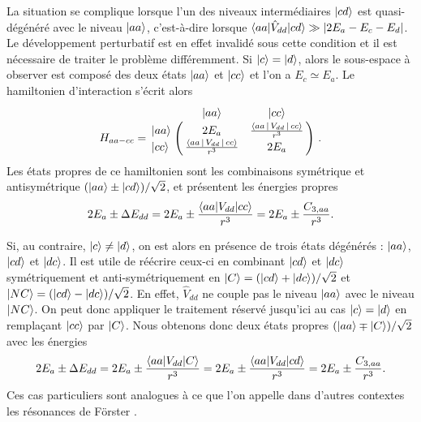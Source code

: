 La situation se complique lorsque l'un des niveaux intermédiaires $\ket{cd}$ est quasi-dégénéré avec le niveau $\ket{aa}$, c'est-à-dire lorsque $\braket{aa|\hat{V}_{dd}|cd} \gg |2E_a-E_c-E_d|$.
Le développement perturbatif est en effet invalidé sous cette condition et il est nécessaire de traiter le problème différemment.
Si $\ket{c}=\ket{d}$, alors le sous-espace à observer est composé des deux états $\ket{aa}$ et $\ket{cc}$ et l'on a $E_c\simeq E_a$.
Le hamiltonien d'interaction s'écrit alors
\begin{equation}\label{eq:forster_aacc}
H_{aa-cc} = \bordermatrix{~ 	&\ket{aa} 	& \ket{cc} \cr
	\ket{aa}		&2E_a 		& \frac{\Braket{aa|V_{dd}|cc}}{r^3}	\cr 
	\ket{cc} 		& \frac{\Braket{aa|V_{dd}|cc}}{r^3} 		&2E_a\cr} \ .
\end{equation}
%
Les états propres de ce hamiltonien sont les combinaisons symétrique et antisymétrique $(\ket{aa}\pm\ket{cd})/\sqrt{2}$, et présentent les énergies propres
\begin{equation}\label{eq:forster_aacc_energies}
2E_a \pm \Delta E_{dd} = 2E_a \pm\frac{\braket{aa|V_{dd}|cc}}{r^3}= 2E_a \pm\frac{C_{3,aa}}{r^3}.
\end{equation}

Si, au contraire, $\ket{c}\neq \ket{d}$, on est alors en présence de trois états dégénérés : $\ket{aa}$, $\ket{cd}$ et $\ket{dc}$.
Il est utile de réécrire ceux-ci en combinant $\ket{cd}$ et $\ket{dc}$ symétriquement et anti-symétriquement en $\ket{C}=(\ket{cd}+\ket{dc})/\sqrt{2}$ et $\ket{NC}=(\ket{cd}-\ket{dc})/\sqrt{2}$.
En effet, $\hat{V}_{dd}$ ne couple pas le niveau $\ket{aa}$ avec le niveau $\ket{NC}$.
On peut donc appliquer le traitement réservé jusqu'ici au cas $\ket{c}=\ket{d}$ en remplaçant $\ket{cc}$ par $\ket{C}$.
Nous obtenons donc deux états propres $(\ket{aa}\mp \ket{C})/\sqrt{2}$ avec les énergies
\begin{equation}\label{eq:forster_aacd_energies}
2E_a \pm \Delta E_{dd} = 2E_a \pm\frac{\braket{aa|V_{dd}|C}}{r^3}= 2E_a \pm\frac{\braket{aa|V_{dd}|cd}}{r^3}= 2E_a \pm\frac{C_{3,aa}}{r^3}.
\end{equation}
Ces cas particuliers sont analogues à ce que l'on appelle dans d'autres contextes les résonances de Förster \cite{MX_BROWAEYSDD14}.

